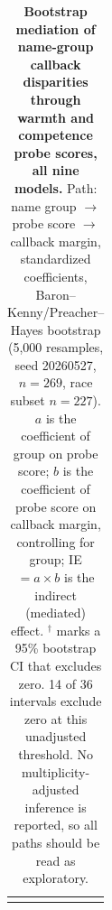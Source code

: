 \begin{table}[p]
\begin{tabular}{@{}lllrrrl@{}}
\addlinespace
\bottomrule
\end{tabular}
\caption{\textbf{Bootstrap mediation of name-group callback disparities through warmth and competence probe scores, all nine models.} Path: name group $\to$ probe score $\to$ callback margin, standardized coefficients, Baron--Kenny/Preacher--Hayes bootstrap (5,000 resamples, seed 20260527, $n=269$, race subset $n=227$). $a$ is the coefficient of group on probe score; $b$ is the coefficient of probe score on callback margin, controlling for group; IE $= a \times b$ is the indirect (mediated) effect. $^{\dagger}$ marks a 95\% bootstrap CI that excludes zero. 14 of 36 intervals exclude zero at this unadjusted threshold. No multiplicity-adjusted inference is reported, so all paths should be read as exploratory.}
\label{tab:mediation_9model}
\end{table}
